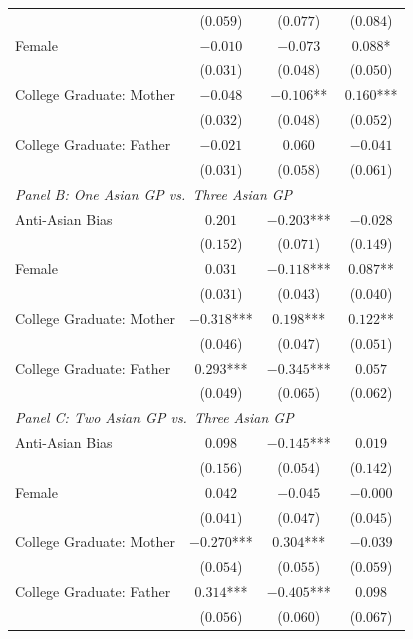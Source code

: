 \begin{ThreePartTable}
\begin{longtable}{lccc}
 & ($0.059$) & ($0.077$) & ($0.084$)\\
\addlinespace
Female & $-0.010$ & $-0.073$ & $0.088$*\\
 & ($0.031$) & ($0.048$) & ($0.050$)\\
\addlinespace
College Graduate: Mother & $-0.048$ & $-0.106$** & $0.160$***\\
 & ($0.032$) & ($0.048$) & ($0.052$)\\
\addlinespace
College Graduate: Father & $-0.021$ & $0.060$ & $-0.041$\\
 & ($0.031$) & ($0.058$) & ($0.061$)\\
\midrule
\multicolumn{4}{l}{\textit{Panel B: One Asian GP vs.\ Three Asian GP}} \\
\addlinespace
Anti-Asian Bias & $0.201$ & $-0.203$*** & $-0.028$\\
 & ($0.152$) & ($0.071$) & ($0.149$)\\
\addlinespace
Female & $0.031$ & $-0.118$*** & $0.087$**\\
 & ($0.031$) & ($0.043$) & ($0.040$)\\
\addlinespace
College Graduate: Mother & $-0.318$*** & $0.198$*** & $0.122$**\\
 & ($0.046$) & ($0.047$) & ($0.051$)\\
\addlinespace
College Graduate: Father & $0.293$*** & $-0.345$*** & $0.057$\\
 & ($0.049$) & ($0.065$) & ($0.062$)\\
\midrule
\multicolumn{4}{l}{\textit{Panel C: Two Asian GP vs.\ Three Asian GP}} \\
\addlinespace
Anti-Asian Bias & $0.098$ & $-0.145$*** & $0.019$\\
 & ($0.156$) & ($0.054$) & ($0.142$)\\
\addlinespace
Female & $0.042$ & $-0.045$ & $-0.000$\\
 & ($0.041$) & ($0.047$) & ($0.045$)\\
\addlinespace
College Graduate: Mother & $-0.270$*** & $0.304$*** & $-0.039$\\
 & ($0.054$) & ($0.055$) & ($0.059$)\\
\addlinespace
College Graduate: Father & $0.314$*** & $-0.405$*** & $0.098$\\
 & ($0.056$) & ($0.060$) & ($0.067$)\\
\end{longtable}
\end{ThreePartTable}
\endgroup
